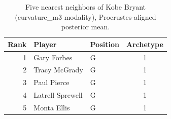 \begin{table}[htbp]
  \centering\small
  \begin{tabular}{rllc}
    \toprule
    Rank & Player & Position & Archetype \\
    \midrule
    1 & Gary Forbes & G & 1 \\
    2 & Tracy McGrady & G & 1 \\
    3 & Paul Pierce & G & 1 \\
    4 & Latrell Sprewell & G & 1 \\
    5 & Monta Ellis & G & 1 \\
    \bottomrule
  \end{tabular}
  \caption{Five nearest neighbors of Kobe Bryant (curvature_m3 modality), Procrustes-aligned posterior mean.}
  \label{tab:Kobe_Bryant_neighbors_curvature_m3}
\end{table}

